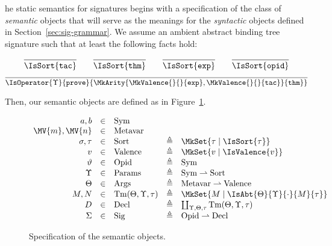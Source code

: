 \documentclass{report}
\begin{document}
\newcommand\SemSym{\mathrm{Sym}}
\newcommand\SemMetavar{\mathrm{Metavar}}
\newcommand\SemOpid{\mathrm{Opid}}
\newcommand\SemSig{\mathrm{Sig}}
\newcommand\SemParams{\mathrm{Params}}
\newcommand\SemArgs{\mathrm{Args}}
\newcommand\SemTerm[3]{\mathrm{Tm}(#1,#2,#3)}
\newcommand\SemSort{\mathrm{Sort}}
\newcommand\SemValence{\mathrm{Valence}}
\newcommand\SemDecl{\mathrm{Decl}}
\newcommand\Partial[2]{#1\rightharpoonup #2}

\newcommand\SemExprs{\mathbf{E}}
\newcommand\AbtSortTac{\mathtt{tac}}
\newcommand\AbtSortThm{\mathtt{thm}}
\newcommand\AbtSortExp{\mathtt{exp}}
\newcommand\AbtSortOpid{\mathtt{opid}}
\newcommand\OpProve{\mathtt{prove}}

\newcommand\OpCust

The static semantics for \RedJonPRL{} signatures begins with a specification of
the class of \emph{semantic} objects that will serve as the meanings for the
\emph{syntactic} objects defined in Section~\ref{sec:sig-grammar}. We assume an
ambient abstract binding tree signature such that at least the following facts
hold:

\[
  \infer{
    \IsSort{\AbtSortTac}
  }{
  }
  \qquad
  \infer{
    \IsSort{\AbtSortThm}
  }{
  }
  \qquad
  \infer{
    \IsSort{\AbtSortExp}
  }{
  }
  \qquad
  \infer{
    \IsSort{\AbtSortOpid}
  }{
  }
\]
\[
  \infer{
    \IsOperator{\Upsilon}{\OpProve}{
      \MkArity{
        \MkValence{}{}{\AbtSortExp},
        \MkValence{}{}{\AbtSortTac}
      }{\AbtSortThm}
    }
  }{
  }
\]

Then, our semantic objects are defined as in Figure~\ref{fig:sig-semantic-objects}.

\begin{figure}[H]
  \begin{displaymath}
    \begin{array}{rclcl}
      a,b &\in &\SemSym\\
      \MV{m},\MV{n} &\in &\SemMetavar\\
      \sigma,\tau &\in &\SemSort &\triangleq & \MkSet{\tau\mid\IsSort{\tau}}\\
      v &\in &\SemValence &\triangleq & \MkSet{v\mid\IsValence{v}}\\
      \vartheta &\in &\SemOpid  &\triangleq &\SemSym\\
      \Upsilon &\in &\SemParams &\triangleq & \Partial{\SemSym}{\SemSort}\\
      \Theta &\in &\SemArgs &\triangleq & \Partial{\SemMetavar}{\SemValence}\\
      M,N &\in &\SemTerm{\Theta}{\Upsilon}{\tau} &\triangleq & \MkSet{M\mid\IsAbt{\Theta}{\Upsilon}{\cdot}{M}{\tau}}\\
      D &\in &\SemDecl &\triangleq & \coprod_{\Upsilon,\Theta,\tau} \SemTerm{\Theta}{\Upsilon}{\tau}\\
      \Sigma &\in &\SemSig &\triangleq & \Partial{\SemOpid}{\SemDecl}
    \end{array}
  \end{displaymath}
  \caption{Specification of the semantic objects.}
  \label{fig:sig-semantic-objects}
\end{figure}
\end{document}
